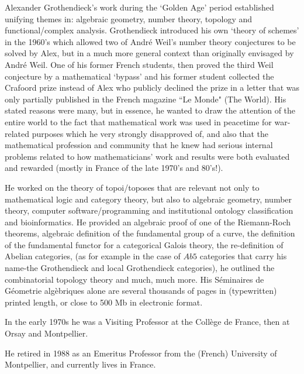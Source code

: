 \documentclass[12pt]{article}
\begin{document}
 Alexander Grothendieck's work during the `Golden Age' period established unifying themes in: algebraic geometry, number theory, topology and functional/complex analysis. Grothendieck introduced his own `theory of schemes' in the 1960's which allowed two of Andr\'e Weil's number theory conjectures to be solved by Alex, but in a much more general context
than originally envisaged by Andr\'e Weil. One of his former French students, then proved the third Weil conjecture by a mathematical `bypass' and his former student collected the Crafoord prize instead of Alex who publicly declined the prize in a letter that was only partially  published in the French magazine ``Le Monde" (The World). His stated
reasons were many, but in essence, he wanted to draw the attention of the entire world to the fact that mathematical
work was used in peacetime for war-related purposes which he very strongly disapproved of, and also that the mathematical profession and community that he knew had serious internal problems related to how mathematicians' work and results were both evaluated and rewarded (mostly in France of the late 1970's and 80's!).  

 He worked on the theory of topoi/toposes that are relevant not only to mathematical logic and category theory, but also to algebraic geometry, number theory, computer software/programming and institutional ontology classification and bioinformatics. He provided an algebraic proof of one of the Riemann-Roch theorems, algebraic definition of the fundamental group of a curve, the definition of the fundamental functor for a categorical Galois theory, the re-definition of Abelian categories, (as for example in the case of $A b5$ categories that carry his name-the Grothendieck and local Grothendieck categories), he outlined the 
combinatorial topology theory and much, much more. His S\'eminaires de G\'eometrie alg\`ebriques alone are several thousands of pages in (typewritten) printed length, or close to 500 Mb in electronic format.

In the early 1970s he was a Visiting Professor at the Coll\`ege de France, then at Orsay and Montpellier.

He retired in 1988 as an Emeritus Professor from the (French) University of Montpellier, and currently lives in France.
\end{document}
